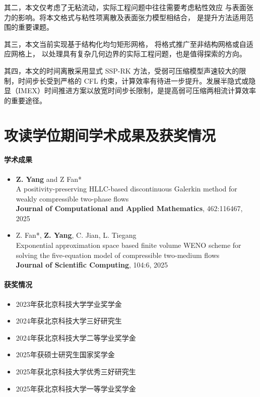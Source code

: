 \documentclass[12pt,a4paper]{article}
\numberwithin{equation}{section}    %
\begin{document}
其二，本文仅考虑了无粘流动，实际工程问题中往往需要考虑粘性效应
与表面张力的影响。将本文格式与粘性项离散及表面张力模型相结合，
是提升方法适用范围的重要课题。

其三，本文当前实现基于结构化均匀矩形网格，
将格式推广至非结构网格或自适应网格上，
以处理具有复杂几何边界的实际工程问题，也是值得探索的方向。

其四，本文的时间离散采用显式 SSP-RK 方法，受弱可压缩模型声速较大的限制，时间步长受到严格的 CFL 约束，计算效率有待进一步提升。发展半隐式或隐显（IMEX）时间推进方案以放宽时间步长限制，是提高弱可压缩两相流计算效率的重要途径。

\cleardoublepage



\cleardoublepage
\section{攻读学位期间学术成果及获奖情况}
\paragraph{学术成果}
\begin{itemize}
  \item \textbf{Z. Yang} and Z Fan* \\ 
  A positivity-preserving HLLC-based discontinuous Galerkin method for weakly compressible two-phase flows \\ 
  \textbf{Journal of Computational and Applied Mathematics}, 462:116467, 2025
  \item Z. Fan*, \textbf{Z. Yang}, C. Jian, L. Tiegang \\
  Exponential approximation space based finite volume WENO scheme for solving the five-equation model of compressible two-medium flows\\ 
  \textbf{Journal of Scientific Computing}, 104:6, 2025 
\end{itemize}
\paragraph{获奖情况}
\begin{itemize}
      \item 2023\kern0pt{}年获北京科技大学学业奖学金
      \item 2024\kern0pt{}年获北京科技大学三好研究生
      \item 2024\kern0pt{}年获北京科技大学二等学业奖学金
      \item 2025\kern0pt{}年获硕士研究生国家奖学金
      \item 2025\kern0pt{}年获北京科技大学优秀三好研究生
      \item 2025\kern0pt{}年获北京科技大学一等学业奖学金
\end{itemize}
\end{document}
